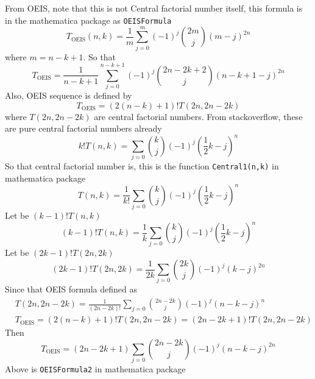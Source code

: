 From OEIS, note that this is not Central factorial number itself, this formula is in the mathematica package as
\texttt{OEISFormula}
\begin{equation*}
    T_{\mathrm{OEIS}} (n,k) = \frac{1}{m} \sum_{j=0}^{m} (-1)^{j} \binom{2m}{j} (m-j)^{2n}
\end{equation*}
where $m=n-k+1$.
So that
\begin{equation*}
    T_{\mathrm{OEIS}} = \frac{1}{n-k+1} \sum_{j=0}^{n-k+1} (-1)^{j} \binom{2n-2k+2}{j} (n-k+1-j)^{2n}
\end{equation*}
Also, OEIS sequence is defined by
\begin{equation*}
    T_{\mathrm{OEIS}} = (2(n-k) + 1)! T(2n, 2n-2k)
\end{equation*}
where $T(2n, 2n-2k)$ are central factorial numbers.
From stackoverflow, these are pure central factorial numbers already
\begin{equation*}
    k! T(n,k) = \sum_{j=0} \binom{k}{j} (-1)^{j} \left( \frac{1}{2}k - j \right)^{n}
\end{equation*}
So that central factorial number is, this is the function \texttt{Central1(n,k)} in mathematica package
\begin{equation*}
    T(n,k) = \frac{1}{k!} \sum_{j=0} \binom{k}{j} (-1)^{j} \left( \frac{1}{2}k - j \right)^{n}
\end{equation*}
Let be $(k-1)! T(n,k)$
\begin{equation*}
(k-1)
    !T(n,k) = \frac{1}{k} \sum_{j=0} \binom{k}{j} (-1)^{j} \left( \frac{1}{2}k - j \right)^{n}
\end{equation*}
Let be $(2k-1)! T(2n, 2k)$
\begin{equation*}
(2k-1)
    !T(2n, 2k) = \frac{1}{2k} \sum_{j=0} \binom{2k}{j} (-1)^{j} (k-j)^{2n}
\end{equation*}
Since that OEIS formula defined as
\begin{equation*}
    \begin{split}
        &T(2n, 2n-2k) = \frac{1}{(2n-2k)!} \sum_{j=0} \binom{2n-2k}{j} (-1)^{j} \left( n - k - j \right)^{n} \\
        &T_{\mathrm{OEIS}} = (2(n-k) + 1)! T(2n, 2n-2k) = (2n-2k+1)! T(2n, 2n-2k)
    \end{split}
\end{equation*}
Then
\begin{equation*}
    T_{\mathrm{OEIS}} = (2n-2k+1) \sum_{j=0} \binom{2n-2k}{j} (-1)^{j} (n-k-j)^{2n}
\end{equation*}
Above is \texttt{OEISFormula2} in mathematica package